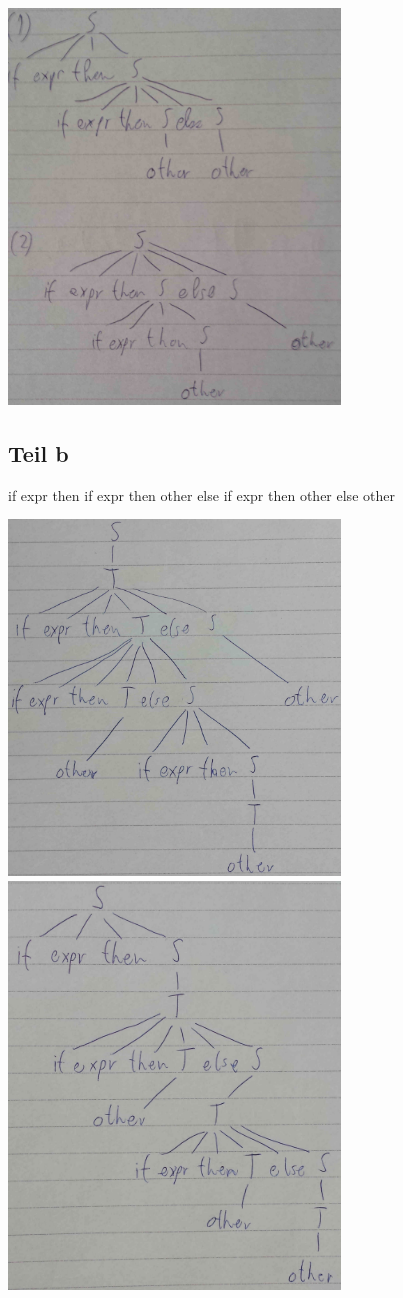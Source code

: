 \documentclass[10pt,a4paper]{article}
\begin{document}
\includegraphics[width=250pt]{3_a.jpg}

\subsection{Teil b}

if expr then if expr then other else if expr then other else other

\includegraphics[width=250pt]{3_b_1.jpg}
\includegraphics[width=250pt]{3_b_2.jpg}
\end{document}
